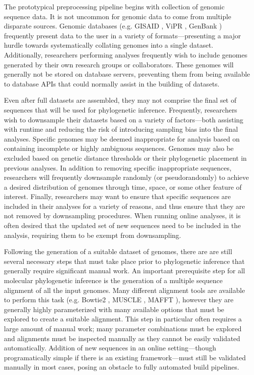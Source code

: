 The prototypical preprocessing pipeline begins with collection of genomic sequence data.
It is not uncommon for genomic data to come from multiple disparate sources.
Genomic databases (e.g. GISAID \cite{shu2017gisaid}, ViPR \cite{pickett2012vipr}, GenBank \cite{benson2012genbank}) frequently present data to the user in a variety of formats---presenting a major hurdle towards systematically collating genomes into a single dataset.
Additionally, researchers performing analyses frequently wish to include genomes generated by their own research groups or collaborators.
These genomes will generally not be stored on database servers, preventing them from being available to database APIs that could normally assist in the building of datasets.

Even after full datasets are assembled, they may not comprise the final set of sequences that will be used for phylogenetic inference.
Frequently, researchers wish to downsample their datasets based on a variety of factors---both assisting with runtime and reducing the risk of introducing sampling bias into the final analyses.
Specific genomes may be deemed inappropriate for analysis based on containing incomplete or highly ambiguous sequences.
Genomes may also be excluded based on genetic distance thresholds or their phylogenetic placement in previous analyses.
In addition to removing specific inappropriate sequences, researchers will frequently downsample randomly (or pseudorandomly) to achieve a desired distribution of genomes through time, space, or some other feature of interest.
Finally, researchers may want to ensure that specific sequences are included in their analyses for a variety of reasons, and thus ensure that they are not removed by downsampling procedures.
When running online analyses, it is often desired that the updated set of new sequences need to be included in the analysis, requiring them to be exempt from downsampling.

Following the generation of a suitable dataset of genomes, there are are still several necessary steps that must take place prior to phylogenetic inference that generally require significant manual work.
An important prerequisite step for all molecular phylogenetic inference is the generation of a multiple sequence alignment of all the input genomes.
Many different alignment tools are available to perform this task (e.g. Bowtie2 \cite{langmead2012fast}, MUSCLE \cite{edgar2004muscle}, MAFFT \cite{katoh2013mafft}), however they are generally highly parameterized with many available options that must be explored to create a suitable alignment.
This step in particular often requires a large amount of manual work; many parameter combinations must be explored and alignments must be inspected manually as they cannot be easily validated automatically.
Addition of new sequences in an online setting---though programatically simple if there is an existing framework---must still be validated manually in most cases, posing an obstacle to fully automated build pipelines.

